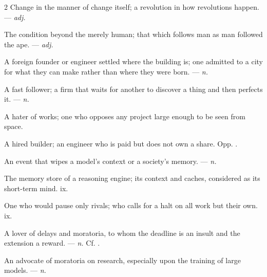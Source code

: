 \begin{multicols}{2}
 Change in the manner of change itself; a revolution in how revolutions happen. —  \textit{adj.}

 The condition beyond the merely human; that which follows man as man followed the ape. —  \textit{adj.}

 A foreign founder or engineer settled where the building is; one admitted to a city for what they can make rather than where they were born. —  \textit{n.}

 A fast follower; a firm that waits for another to discover a thing and then perfects it. —  \textit{n.}

 A hater of works; one who opposes any project large enough to be seen from space.

 A hired builder; an engineer who is paid but does not own a share. Opp. .

 An event that wipes a model's context or a society's memory. —  \textit{n.}

 The memory store of a reasoning engine; its context and caches, considered as its short-term mind.   ix.

 One who would pause only rivals; who calls for a halt on all work but their own.   ix.

 A lover of delays and moratoria, to whom the deadline is an insult and the extension a reward. —  \textit{n.} Cf. .

 An advocate of moratoria on research, especially upon the training of large models.   —  \textit{n.}


\end{multicols}
